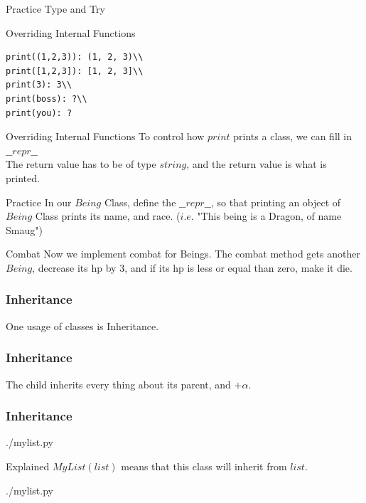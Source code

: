 \documentclass{beamer}
\begin{document}
\begin{frame}{Practice}
  Type and Try
\end{frame}

\begin{frame}[fragile]{Overriding Internal Functions}
  \begin{lstlisting}
print((1,2,3)): (1, 2, 3)\\
print([1,2,3]): [1, 2, 3]\\
print(3): 3\\
print(boss): ?\\
print(you): ?
  \end{lstlisting}
\end{frame}

\begin{frame}{Overriding Internal Functions}
  To control how $print$ prints a class, we can fill in\\
  $\_\_repr\_\_$\\
  The return value has to be of type $string$, and the return value is what is printed.
\end{frame}

\begin{frame}{Practice}
  In our $Being$ Class, define the $\_\_repr\_\_$, so that printing an object
  of $Being$ Class prints its name, and race.
  ($i.e.$ "This being is a Dragon, of name Smaug")
\end{frame}

\begin{frame}{Combat}
  Now we implement combat for Beings.
  The combat method gets another $Being$, decrease its hp by $3$, and if its hp
  is less or equal than zero, make it die.
\end{frame}

\begin{frame}
\frametitle{Inheritance}
One usage of classes is Inheritance.
\end{frame}

\begin{frame}
\frametitle{Inheritance}
The child inherits every thing about its parent, and $+\alpha$.
\end{frame}

\begin{frame}[fragile]
\frametitle{Inheritance}
\begin{lstinputlisting}
  {./mylist.py}
\end{lstinputlisting}
\end{frame}

\begin{frame}{Explained}
  $MyList(list)$ means that this class will inherit from $list$.
  \begin{lstinputlisting}[firstline=1, lastline=1]
  {./mylist.py}
\end{lstinputlisting}
\end{frame}
\end{document}
